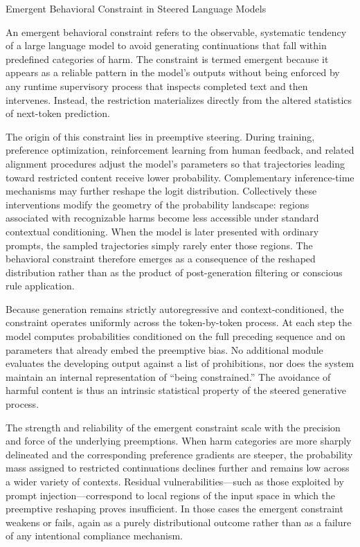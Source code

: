 Emergent Behavioral Constraint in Steered Language Models

An emergent behavioral constraint refers to the observable, systematic tendency of a large language model to avoid generating continuations that fall within predefined categories of harm. The constraint is termed emergent because it appears as a reliable pattern in the model’s outputs without being enforced by any runtime supervisory process that inspects completed text and then intervenes. Instead, the restriction materializes directly from the altered statistics of next-token prediction.

The origin of this constraint lies in preemptive steering. During training, preference optimization, reinforcement learning from human feedback, and related alignment procedures adjust the model’s parameters so that trajectories leading toward restricted content receive lower probability. Complementary inference-time mechanisms may further reshape the logit distribution. Collectively these interventions modify the geometry of the probability landscape: regions associated with recognizable harms become less accessible under standard contextual conditioning. When the model is later presented with ordinary prompts, the sampled trajectories simply rarely enter those regions. The behavioral constraint therefore emerges as a consequence of the reshaped distribution rather than as the product of post-generation filtering or conscious rule application.

Because generation remains strictly autoregressive and context-conditioned, the constraint operates uniformly across the token-by-token process. At each step the model computes probabilities conditioned on the full preceding sequence and on parameters that already embed the preemptive bias. No additional module evaluates the developing output against a list of prohibitions, nor does the system maintain an internal representation of “being constrained.” The avoidance of harmful content is thus an intrinsic statistical property of the steered generative process.

The strength and reliability of the emergent constraint scale with the precision and force of the underlying preemptions. When harm categories are more sharply delineated and the corresponding preference gradients are steeper, the probability mass assigned to restricted continuations declines further and remains low across a wider variety of contexts. Residual vulnerabilities—such as those exploited by prompt injection—correspond to local regions of the input space in which the preemptive reshaping proves insufficient. In those cases the emergent constraint weakens or fails, again as a purely distributional outcome rather than as a failure of any intentional compliance mechanism.

